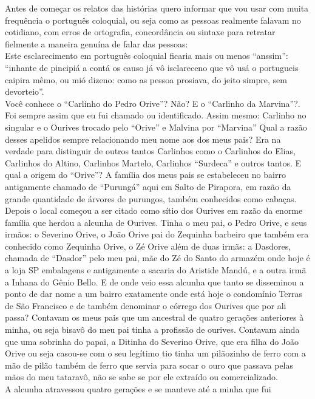 \documentclass[12pt,brazil,]{book}
\begin{document}
Antes de começar os relatos das histórias quero informar que vou usar
com muita frequência o português coloquial, ou seja como as pessoas
realmente falavam no cotidiano, com erros de ortografia, concordância ou
sintaxe para retratar fielmente a maneira genuína de falar das
pessoas:\\
Este esclarecimento em português coloquial ficaria mais ou menos
``anssim'':\\
``inhante de pincipiá a contá os causo já vô isclareceno que vô usá o
portugueis caipira mêmo, ou mió dizeno: como as pessoa prosiava, do
jeito simpre, sem devorteio''.\\
Você conhece o ``Carlinho do Pedro Orive''? Não? E o ``Carlinho da
Marvina''?. Foi sempre assim que eu fui chamado ou identificado. Assim
mesmo: Carlinho no singular e o Ourives trocado pelo ``Orive'' e Malvina
por ``Marvina'' Qual a razão desses apelidos sempre relacionando meu
nome aos dos meus pais? Era na verdade para distinguir de outros tantos
Carlinhos como o Carlinhos do Elias, Carlinhos do Altino, Carlinhos
Martelo, Carlinhos ``Surdeca'' e outros tantos. E qual a origem do
``Orive''? A família dos meus pais se estabeleceu no bairro antigamente
chamado de ``Purungá'' aqui em Salto de Pirapora, em razão da grande
quantidade de árvores de purungos, também conhecidos como cabaças.
Depois o local começou a ser citado como sítio dos Ourives em razão da
enorme família que herdou a alcunha de Ourives. Tinha o meu pai, o Pedro
Orive, e seus irmãos: o Severino Orive, o João Orive pai do Zequinha
barbeiro que também era conhecido como Zequinha Orive, o Zé Orive além
de duas irmãs: a Dasdores, chamada de ``Dasdor'' pelo meu pai, mãe do Zé
do Santo do armazém onde hoje é a loja SP embalagens e antigamente a
sacaria do Aristide Mandú, e a outra irmã a Inhana do Gênio Bello. E de
onde veio essa alcunha que tanto se disseminou a ponto de dar nome a um
bairro exatamente onde está hoje o condomínio Terras de São Francisco e
de também denominar o córrego dos Ourives que por ali passa? Contavam os
meus pais que um ancestral de quatro gerações anteriores à minha, ou
seja bisavô do meu pai tinha a profissão de ourives. Contavam ainda que
uma sobrinha do papai, a Ditinha do Severino Orive, que era filha do
João Orive ou seja casou-se com o seu legítimo tio tinha um pilãozinho
de ferro com a mão de pilão também de ferro que servia para socar o ouro
que passava pelas mãos do meu tataravô, não se sabe se por ele extraído
ou comercializado.\\
A alcunha atravessou quatro gerações e se manteve até a minha que fui
\end{document}

